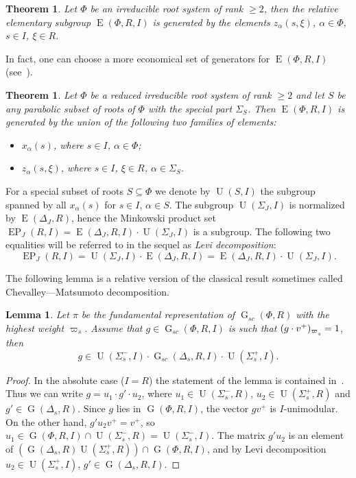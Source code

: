 \documentclass[12pt]{amsart}
\numberwithin{equation}{section}
\newcounter{thmcounter} \newcounter{lemmacounter}
\newtheorem{thm}[thmcounter]{Theorem}
\newtheorem{lemma}[lemmacounter]{Lemma}
\theoremstyle{definition}
\DeclareMathOperator{\G}{G}
\DeclareMathOperator{\E}{E}
\DeclareMathOperator{\EP}{EP}
\DeclareMathOperator{\U}{U}
\def\ssub#1{\mathchoice
   {_{\lower2pt\hbox{$\scriptstyle #1$}}}
   {_{\lower2pt\hbox{$\scriptstyle #1$}}}
   {_{\lower1.5pt\hbox{$\scriptscriptstyle #1$}}}
   {_{\!\lower1.5pt\hbox{$\scriptscriptstyle #1$}}}}
\begin{document}
\begin{thm}\label{theorem:Tits-Vaserstein} Let $\Phi$ be an irreducible root system of rank $\geq 2$, then the relative elementary subgroup $\E(\Phi, R, I)$
is generated by the elements $z_\alpha(s, \xi)$, $\alpha\in \Phi$, $s\in I$, $\xi\in R$.
\end{thm}

In fact, one can choose a more economical set of generators for $\E(\Phi, R, I)$ (see~\cite[Theorem~3.4]{S}).
\begin{thm}\label{theorem:Stepanov}
Let $\Phi$ be a reduced irreducible root system of rank $\geq 2$ and let $S$ be any parabolic subset of roots of $\Phi$ with the special part $\Sigma_S$.
Then $\E(\Phi, R, I)$ is generated by the union of the following two families of elements:
\begin{itemize}
\item $x_{\alpha}(s)$, where $s\in I$, $\alpha\in\Phi$;
\item $z_\alpha(s,\xi)$, where $s\in I$, $\xi\in R$, $\alpha\in\Sigma_S$.
\end{itemize}
\end{thm}
 
For a special subset of roots $S\subseteq \Phi$ we denote by $\U(S, I)$ the subgroup spanned by all $x_{\alpha}(s)$ for $s\in I$, $\alpha\in S$.
The subgroup $\U(\Sigma_J, I)$ is normalized by $\E(\Delta_J, R)$, hence the Minkowski product set $\EP_J(R, I) = \E(\Delta_J, R, I) \cdot \U(\Sigma_J, I)$ is a subgroup. 
The following two equalities will be referred to in the sequel as {\it Levi decomposition}: 
\[ \EP_J(R, I) = \U(\Sigma_J, I) \cdot \E(\Delta_J, R, I) = \E(\Delta_J, R, I) \cdot \U(\Sigma_J, I). \]

The following lemma is a relative version of the classical result sometimes called Chevalley---Matsumoto decomposition.
\begin{lemma}\label{lemma:Chevalley-Matsumoto}
Let $\pi$ be the fundamental representation of $\G_{sc}(\Phi, R)$ with the highest weight $\varpi_s$.
Assume that $g\in \G_{sc}(\Phi, R, I)$ is such that $(g\cdot v^+)_{\varpi\ssub{s}}=1$, then 
\[ g \in \U(\Sigma_s^-, I) \cdot \G_{sc}(\Delta_s, R, I) \cdot \U(\Sigma_s^+, I). \]
\end{lemma}
\begin{proof}
In the absolute case ($I=R$) the statement of the lemma is contained in~\cite[Theorem~1.3]{St78}. Thus we can write $g=u_1\cdot g'\cdot u_2$, where $u_1\in\U(\Sigma_s^-,R)$, $u_2\in\U(\Sigma_s^+,R)$ and $g'\in\G(\Delta_s,R)$. Since $g$ lies in $\G(\Phi,R,I)$, the vector $gv^+$ is $I$-unimodular. On the other hand, $g'u_2v^+=v^+$, so $u_1\in\G(\Phi,R,I)\cap\U(\Sigma_s^-,R)=\U(\Sigma_s^-,I)$. The matrix $g'u_2$ is an element of $\left(\G(\Delta_s,R)\U(\Sigma_s^+,R)\right)\cap\G(\Phi,R,I)$, and by Levi decomposition $u_2\in\U(\Sigma_s^+,I)$, $g'\in\G(\Delta_s,R,I)$.
\end{proof}
\end{document}
